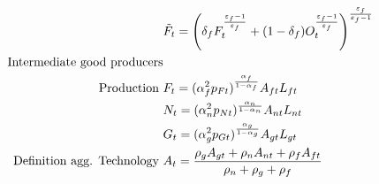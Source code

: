 \begin{align*}
&\tilde{F}_t=\left(\delta_fF_t^\frac{\varepsilon_f-1}{\varepsilon_f}+(1-\delta_f)O_t^\frac{\varepsilon_f-1}{\varepsilon_f}\right)^\frac{\varepsilon_f}{\varepsilon_f-1}\\
\text{Intermediate good producers}\\
\text{Production}\ \vspace{4mm}& F_t= (\alpha_f^2p_{Ft})^\frac{ \alpha_f}{1-\alpha_f}A_{ft}L_{ft}\\
&N_t= (\alpha_n^2p_{Nt})^\frac{ \alpha_n}{1-\alpha_n}A_{nt}L_{nt}\\
&G_t= (\alpha_g^2p_{Gt})^\frac{ \alpha_g}{1-\alpha_g}A_{gt}L_{gt}\\
\text{ Definition agg. Technology}\ \vspace{4mm}&
A_t= \frac{\rho_gA_{gt}+\rho_nA_{nt}+\rho_fA_{ft}}{\rho_n+\rho_g+\rho_f}
\end{align*}

